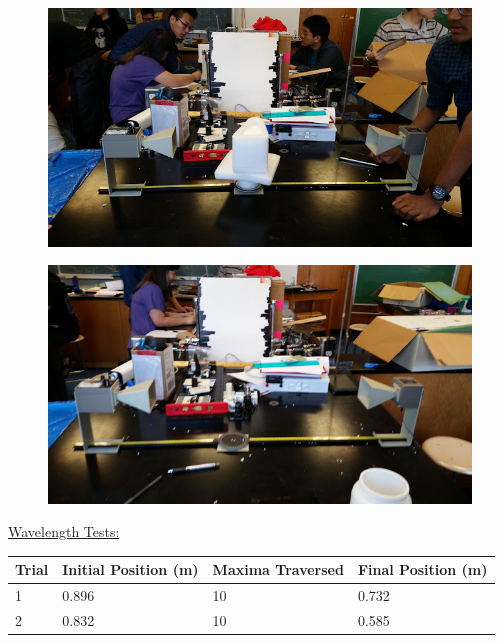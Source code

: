 \documentclass[11pt, titlepage]{article}
\begin{document}
\begin{figure}[h]
\centering
\hspace*{0cm}
\includegraphics[scale=0.7]{lab71.jpg}
\vspace*{0cm}
\end{figure}

\begin{figure}[h]
\centering
\hspace*{0cm}
\includegraphics[scale=0.7]{lab72.jpg}
\vspace*{0cm}
\end{figure}

\underline{Wavelength Tests:}
\begin{center}
\begin{tabular}
{|m{7em}|m{7em}|m{7em}|m{7em}|}
\hline
Trial & Initial Position (m) & Maxima Traversed & Final Position (m) \\
\hline
1 & 0.896 & 10 & 0.732 \\
\hline
2 & 0.832 & 10 & 0.585 \\
\hline
\end{tabular}
\end{center}
\end{document}
